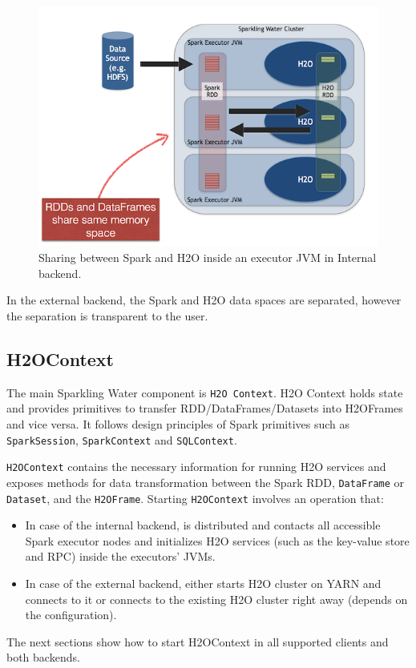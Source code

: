 \documentclass{standalone}
\begin{document}
    \begin{figure}[h!]
        \centering
        \includegraphics[scale=1]{../images/DataShare.png}
        \caption{Sharing between Spark and H2O inside an executor JVM in Internal backend.}
    \end{figure}

    In the external backend, the Spark and H2O data spaces are separated, however the separation is transparent to the user.

    \subsection{H2OContext}

    The main Sparkling Water component is \texttt{H2O Context}.
    H2O Context holds state and provides primitives to transfer RDD/DataFrames/Datasets into H2OFrames and vice versa.
    It follows design principles of Spark primitives such as \texttt{SparkSession}, \texttt{SparkContext} and \texttt{SQLContext}.


    \texttt{H2OContext} contains the necessary information for running H2O services and exposes methods for data
    transformation between the Spark RDD, \texttt{DataFrame} or \texttt{Dataset}, and the \texttt{H2OFrame}.
    Starting \texttt{H2OContext} involves an operation that:

    \begin{itemize}
        \item In case of the internal backend, is distributed and contacts all accessible Spark executor nodes and initializes H2O services (such as the key-value store and RPC) inside the executors' JVMs.
        \item In case of the external backend, either starts H2O cluster on YARN and connects to it or connects to the existing H2O cluster right away (depends on the configuration).
    \end{itemize}

    The next sections show how to start H2OContext in all supported clients and both backends.
\end{document}
